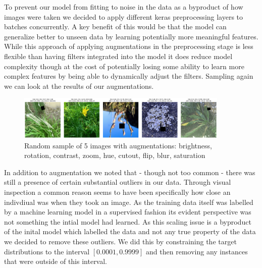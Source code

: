 \documentclass[12pt,a4paper,oneside]{article}
\begin{document}
To prevent our model from fitting to noise in the data as a byproduct of how images were taken we decided to apply different keras preprocessing layers to batches concurrently. A key benefit of this would be that the model can generalize better to unseen data by learning potentially more meaningful features. While this approach of applying augmentations in the preprocessing stage is less flexible than having filters integrated into the model it does reduce model complexity though at the cost of potentially losing some ability to learn more complex features by being able to dynamically adjust the filters. Sampling again we can look at the results of our augmentations. 

\begin{figure}[!h]
    \centering
    \includegraphics[width=0.9\textwidth]{assets/after_aug_img.png}
    \caption{Random sample of 5 images with augmentations: brightness, rotation, contrast, zoom, hue, cutout, flip, blur, saturation}
\end{figure}


\smallskip 
In addition to augmentation we noted that - though not too common - there was still a presence of certain substantial outliers in our data. Through visual inspection a common reason seems to have been specifically how close an indivdiual was when they took an image. As the training data itself was labelled by a machine learning model in a supervised fashion its evident perspective was not something the intial model had learned. As this scaling issue is a byproduct of the inital model which labelled the data and not any true property of the data we decided to remove these outliers. We did this by constraining the target distributions to the interval $[0.0001, 0.9999]$ and then removing any instances that were outside of this interval.
\end{document}

